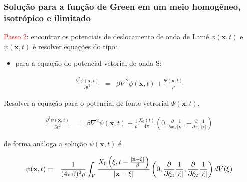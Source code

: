 \documentclass[xcolor=table]{beamer}
\newcommand{\xvec}{\mathbf{x}}
\newcommand{\xivec}{\boldmath \xi}
\begin{document}
\begin{frame}
\frametitle{\textbf{Solu\c{c}\~ao para a fun\c{c}\~ao de Green em um meio homog\^eneo, isotr\'opico e ilimitado}}
\begin{flushleft}
 \textcolor{red}{Passo 2}:\hspace{0.025cm} encontrar os potenciais de deslocamento de onda de Lam\'e $\phi(\xvec,t)$ e $\psi(\xvec,t)$ \'e resolver equa\c{c}\~oes do tipo:\\ 
\end{flushleft}
\begin{itemize}
  \item para a equa\c{c}\~ao do potencial vetorial de onda S: 
 \end{itemize} 
\begin{eqnarray}
  \label{ten1}
       \frac{\partial^2 \psi(\xvec,t)}{\partial t^2} &=& \beta \nabla^2 \phi(\xvec,t) + \frac{\Psi(\xvec,t)}{\rho} \,        
 \end{eqnarray}
\begin{flushleft}
Resolver a equa\c{c}\~ao para o potencial de fonte vetrorial $\Psi(\xvec,t)$,
\end{flushleft}
\begin{eqnarray}
  \label{ten1}
       \frac{\partial^2 \psi(\xvec,t)}{\partial t^2} &=& \beta \nabla^2 \psi(\xvec,t) + \frac{1}{\rho}\frac{X_{0}(t)}{4\pi}\left(0, \frac{\partial }{\partial x_3}  \frac{1}{\left| \xvec \right|},-\frac{\partial }{\partial x_2} \frac{1}{\left| \xvec \right|}  \right) \, 
\end{eqnarray}
\begin{flushleft}
de forma an\'aloga a solu\c{c}\~ao $\psi(\xvec,t)$ \'e
\end{flushleft}
\begin{eqnarray}
  \label{ten1}
\psi(\xvec,t) &=& \frac{1}{(4\pi\beta)^{2} \rho} \int_{V} \frac{ X_{0} \left( \xivec,t - \frac{\left|\xvec - \xivec \right|}{\beta}  \right) }{\left|\xvec - \xivec \right|}  \left(0, \frac{\partial }{\partial \xi_3} \frac{1}{\left| \xivec \right|}, \frac{\partial }{\partial \xi_2} \frac{1}{\left| \xivec \right|} \right) dV(\xivec) \, \nonumber \\
\end{eqnarray}
       
\end{frame}%
\end{document}
